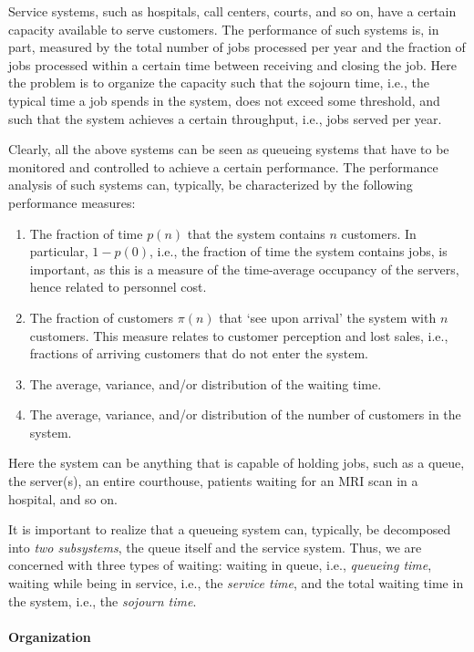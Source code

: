 Service systems, such as hospitals, call centers, courts, and so on,
have a certain capacity available to serve customers. The performance
of such systems is, in part, measured by the total number of jobs
processed per year and the fraction of jobs processed within a certain
time between receiving and closing the job. Here the problem is to
organize the capacity such that the sojourn time, i.e., the typical
time a job spends in the system, does not exceed some threshold, and
such that the system achieves a certain throughput, i.e., jobs served
per year. 

Clearly, all the above systems can be seen as queueing systems that
have to be monitored and controlled to achieve a certain
performance. The performance analysis of such systems can, typically,
be characterized by the following performance measures:
\begin{enumerate}
\item The fraction of time $p(n)$ that the system contains $n$
  customers. In particular, $1-p(0)$, i.e., the fraction of time the
  system contains jobs, is important, as this is a measure of the
  time-average occupancy of the servers, hence related to personnel
  cost.
\item The fraction of customers $\pi(n)$ that `see upon arrival' the
  system with $n$ customers. This measure relates to customer
  perception and lost sales, i.e., fractions of arriving customers
  that do not enter the system.
\item The average, variance, and/or distribution of the waiting time.
\item The average, variance, and/or distribution of the number of customers in the system.\
\end{enumerate}
Here the system can be anything that is capable of holding jobs, such
as a queue, the server(s), an entire courthouse, patients waiting for
an MRI scan in a hospital, and so on.

It is important to realize that a queueing system can, typically, be
decomposed into \emph{two subsystems}, the queue itself and the
service system. Thus, we are concerned with three types of waiting:
waiting in queue, i.e., \emph{queueing time}, waiting while being in
service, i.e., the \emph{service time}, and the total waiting time in
the system, i.e., the \emph{sojourn time}.

\paragraph{Organization}


